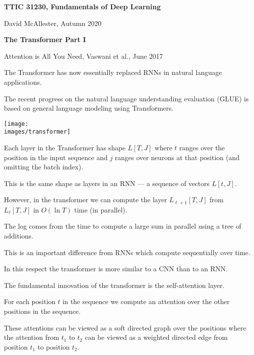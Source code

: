 





{\Huge
  \centerline{\bf TTIC 31230,  Fundamentals of Deep Learning}
  \vfill
  \centerline{David McAllester, Autumn 2020}
  \vfill
  \centerline{\bf  The Transformer Part I}
  \vfill
  \vfill


Attention is All You Need, Vaswani et al., June 2017

\vfill
The Transformer has now essentially replaced RNNs in natural language applications.

\vfill

The recent progress on the natural language understanding evaluation (GLUE) is based on general language modeling using Transformers.

\centerline{\texttt{[image: \\images/transformer]}}

\vfill
Each layer in the Transformer has shape $L[T,J]$ where $t$ ranges over the position in the input sequence and $j$ ranges over neurons at that position
(and omitting the batch index).

\vfill
This is the same shape as layers in an RNN --- a sequence of vectors $L[t,J]$.


However, in the transformer we can compute the layer $L_{\ell+1}[T,J]$ from $L_\ell[T,J]$ in $O(\ln T)$ time (in parallel).

\vfill
The log comes from the time to compute a large sum in parallel using a tree of additions.

\vfill
This is an important difference from RNNs which compute sequentially over time.

\vfill
In this respect the transformer is more similar to a CNN than to an RNN.


The fundamental innovation of the transformer is the self-attention layer.

\vfill
For each position $t$ in the sequence we compute an attention over the other positions in the sequence.

\vfill
These attentions can be viewed as a soft directed graph over the positions where
the attention from $t_1$ to $t_2$ can be viewed as a weighted directed edge from position $t_1$ to position $t_2$.

}

